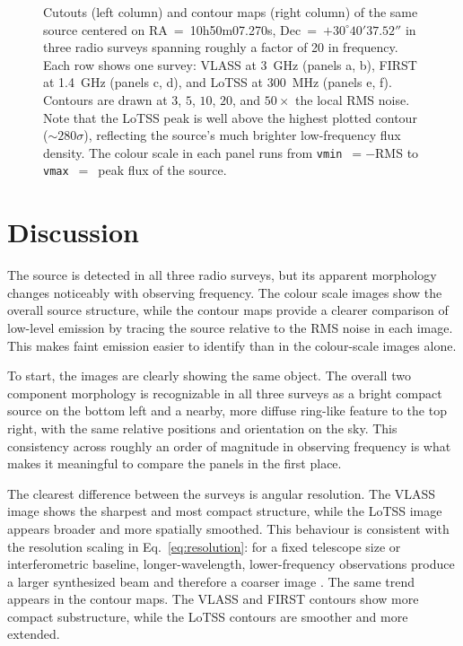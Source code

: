 \documentclass[11pt]{article}
\begin{document}
\begin{figure}[H]
  \caption{Cutouts (left column) and contour maps (right column) of the
           same source centered on RA~=~10h50m07.270s,
           Dec~=~$+30^\circ40'37.52''$ in three radio surveys spanning
           roughly a factor of 20 in frequency. Each row shows one
           survey: VLASS at 3~GHz (panels a, b), FIRST at 1.4~GHz
           (panels c, d), and LoTSS at 300~MHz (panels e, f). Contours
           are drawn at $3$, $5$, $10$, $20$, and $50\times$ the local
           RMS noise. Note that the LoTSS peak is well above the
           highest plotted contour ($\sim 280\sigma$), reflecting the
           source's much brighter low-frequency flux density.
           The colour scale in each panel runs from \texttt{vmin}~$=-$RMS to \texttt{vmax}~$=$~peak flux of the source.}
  \label{fig:six-panel}
\end{figure}


\section{Discussion}
\label{sec:discussion}
The source is detected in all three radio surveys, but its apparent morphology changes noticeably with observing frequency. The colour scale images show the overall source structure, while the contour maps provide a clearer comparison of low-level emission by tracing the source relative to the RMS noise in each image. This makes faint emission easier to identify than in the colour-scale images alone.

To start, the images are clearly showing the same object. The overall two component morphology is recognizable in all three surveys as a bright compact source on the bottom left and a nearby, more diffuse ring-like feature to the top right, with the same relative positions and orientation on the sky. This consistency across roughly an order of magnitude in observing frequency is what makes it meaningful to compare the panels in the first place.

The clearest difference between the surveys is angular resolution. The VLASS image shows the sharpest and most compact structure, while the LoTSS image appears broader and more spatially smoothed. This behaviour is consistent with the resolution scaling in Eq.~\ref{eq:resolution}:
for a fixed telescope size or interferometric baseline, longer-wavelength, lower-frequency observations produce a larger synthesized beam and therefore a coarser image \citep{condon_ransom_2016}. The same trend appears in the contour maps. The VLASS and FIRST contours show more compact substructure, while the LoTSS contours are smoother and more extended.
\end{document}

